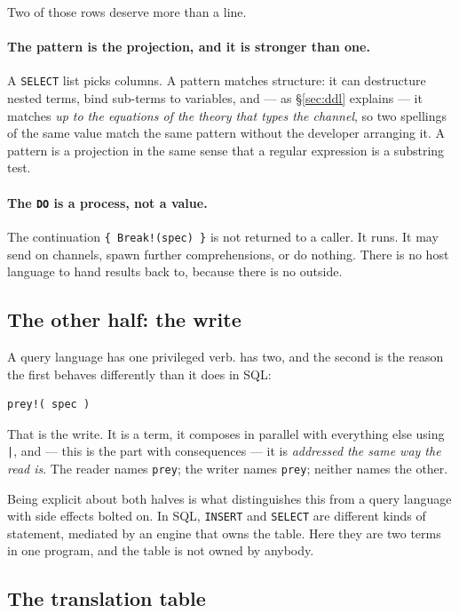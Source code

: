 Two of those rows deserve more than a line.

\paragraph{The pattern is the projection, and it is stronger than one.}
A \texttt{SELECT} list picks columns. A \flang{} pattern matches structure: it
can destructure nested terms, bind sub-terms to variables, and --- as
\S\ref{sec:ddl} explains --- it matches \emph{up to the equations of the theory
that types the channel}, so two spellings of the same value match the same
pattern without the developer arranging it. A pattern is a projection in the
same sense that a regular expression is a substring test.

\paragraph{The \texttt{DO} is a process, not a value.}
The continuation \texttt{\{ Break!(spec) \}} is not returned to a caller. It
runs. It may send on channels, spawn further comprehensions, or do nothing.
There is no host language to hand results back to, because there is no outside.

\subsection{The other half: the write}

A query language has one privileged verb. \flang{} has two, and the second is the
reason the first behaves differently than it does in SQL:

\begin{lstlisting}
prey!( spec )
\end{lstlisting}

That is the write. It is a term, it composes in parallel with everything else
using \texttt{|}, and --- this is the part with consequences --- it is
\emph{addressed the same way the read is}. The reader names \texttt{prey}; the
writer names \texttt{prey}; neither names the other.

Being explicit about both halves is what distinguishes this from a query
language with side effects bolted on. In SQL, \texttt{INSERT} and
\texttt{SELECT} are different kinds of statement, mediated by an engine that
owns the table. Here they are two terms in one program, and the table is not
owned by anybody.

\subsection{The translation table}
\label{sec:table}


